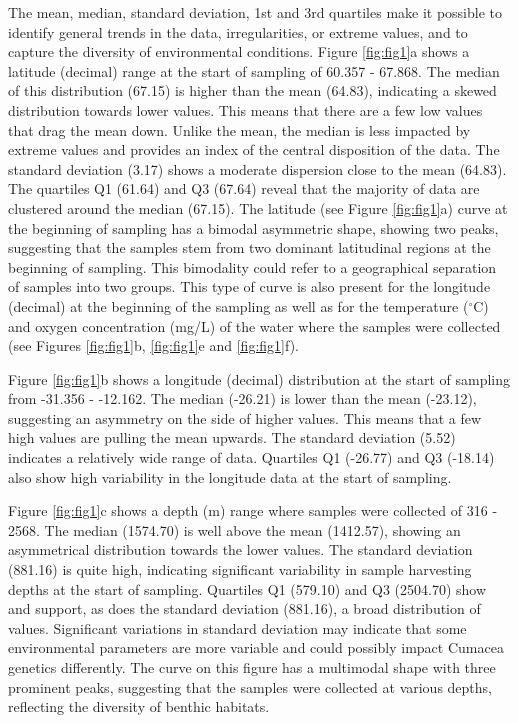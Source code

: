 The mean, median, standard deviation, 1st and 3rd quartiles make it possible to identify general trends in the data, irregularities, or extreme values, and to capture the diversity of environmental conditions. Figure \ref{fig:fig1}a shows a latitude (decimal) range at the start of sampling of 60.357 - 67.868. The median of this distribution (67.15) is higher than the mean (64.83), indicating a skewed distribution towards lower values. This means that there are a few low values that drag the mean down. Unlike the mean, the median is less impacted by extreme values and provides an index of the central disposition of the data.  The standard deviation (3.17) shows a moderate dispersion close to the mean (64.83). The quartiles Q1 (61.64) and Q3 (67.64) reveal that the majority of data are clustered around the median (67.15). The latitude (see Figure \ref{fig:fig1}a) curve at the beginning of sampling has a bimodal asymmetric shape, showing two peaks, suggesting that the samples stem from two dominant latitudinal regions at the beginning of sampling. This bimodality could refer to a geographical separation of samples into two groups. This type of curve is also present for the longitude (decimal) at the beginning of the sampling as well as for the temperature ($^\circ$C) and oxygen concentration (mg/L) of the water where the samples were collected (see Figures \ref{fig:fig1}b, \ref{fig:fig1}e and \ref{fig:fig1}f). 

Figure \ref{fig:fig1}b shows a longitude (decimal) distribution at the start of sampling from -31.356 - -12.162. The median (-26.21) is lower than the mean (-23.12), suggesting an asymmetry on the side of higher values. This means that a few high values are pulling the mean upwards. The standard deviation (5.52) indicates a relatively wide range of data. Quartiles Q1 (-26.77) and Q3 (-18.14) also show high variability in the longitude data at the start of sampling.

Figure \ref{fig:fig1}c shows a depth (m) range where samples were collected of 316 - 2568. The median (1574.70) is well above the mean (1412.57), showing an asymmetrical distribution towards the lower values. The standard deviation (881.16) is quite high, indicating significant variability in sample harvesting depths at the start of sampling. Quartiles Q1 (579.10) and Q3 (2504.70) show and support, as does the standard deviation (881.16), a broad distribution of values. Significant variations in standard deviation may indicate that some environmental parameters are more variable and could possibly impact Cumacea genetics differently. The curve on this figure has a multimodal shape with three prominent peaks, suggesting that the samples were collected at various depths, reflecting the diversity of benthic habitats.

